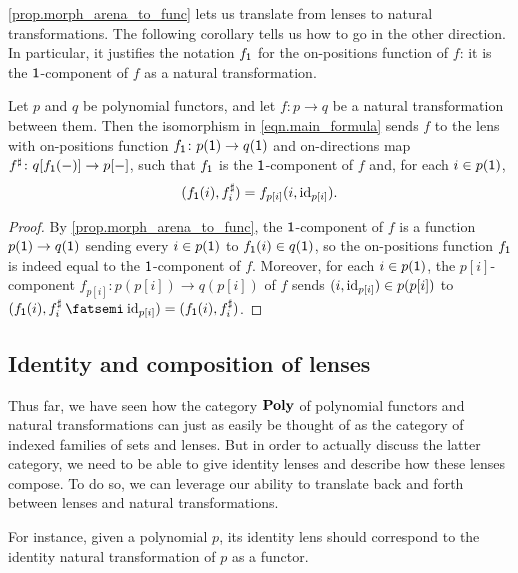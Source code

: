 \documentclass[Book-Poly]{subfiles}
\begin{document}
\cref{prop.morph_arena_to_func} lets us translate from lenses to natural transformations.
The following corollary tells us how to go in the other direction.
In particular, it justifies the notation $f_{\textsf{1}}$ for the on-positions function of $f$: it is the $\textsf{1}$-component of $f$ as a natural transformation.

\begin{corollary} \label{cor.morph_func_to_arena}
Let $p$ and $q$ be polynomial functors, and let $f \colon p \to q$ be a natural transformation between them.
Then the isomorphism in \eqref{eqn.main_formula} sends $f$ to the lens with on-positions function $f_{\textsf{1}}\colon p(\textsf{1})\to q(\textsf{1})$ and on-directions map $f^\sharp\colon q[f_{\textsf{1}}(-)]\to p[-]$, such that $f_{\textsf{1}}$ is the $\textsf{1}$-component of $f$ and, for each $i\in p(\textsf{1})$,
\[
    (f_{\textsf{1}}(i), f^\sharp_i) = f_{p[i]}(i, \mathrm{id}_{p[i]}).
\]
\end{corollary}
\begin{proof}
By \cref{prop.morph_arena_to_func}, the $\textsf{1}$-component of $f$ is a function $p(\textsf{1})\to q(\textsf{1})$ sending every $i \in p(\textsf{1})$ to $f_{\textsf{1}}(i) \in q(\textsf{1})$, so the on-positions function $f_{\textsf{1}}$ is indeed equal to the $\textsf{1}$-component of $f$.
Moreover, for each $i\in p(\textsf{1})$, the $p[i]$-component $f_{p[i]} \colon p(p[i]) \to q(p[i])$ of $f$ sends $(i,\mathrm{id}_{p[i]})\in p(p[i])$ to $(f_\1(i), f^\sharp_i \then \id_{p[i]}) = (f_\1(i), f^\sharp_i)$.
\end{proof}

\subsection{Identity and composition of lenses} \label{subsec.poly.cat.morph.id-comp}

Thus far, we have seen how the category $\mathbf{Poly}$ of polynomial functors and natural transformations can just as easily be thought of as the category of indexed families of sets and lenses.
But in order to actually discuss the latter category, we need to be able to give identity lenses and describe how these lenses compose.
To do so, we can leverage our ability to translate back and forth between lenses and natural transformations.

For instance, given a polynomial $p$, its identity lens should correspond to the identity natural transformation of $p$ as a functor.
\end{document}
